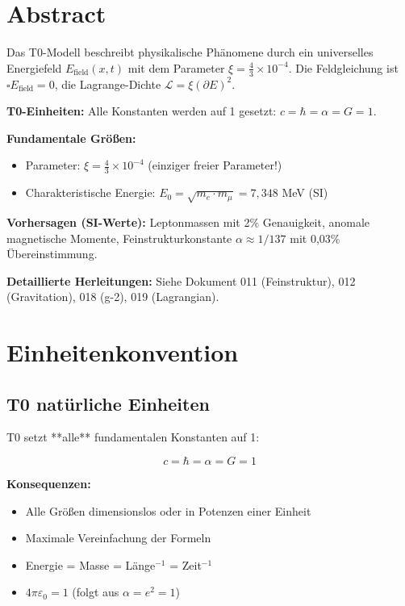 \section*{Abstract}
		Das T0-Modell beschreibt physikalische Phänomene durch ein universelles Energiefeld $E_{\text{field}}(x,t)$ mit dem Parameter $\xi = \frac{4}{3} \times 10^{-4}$. Die Feldgleichung ist $\square E_{\text{field}} = 0$, die Lagrange-Dichte $\mathcal{L} = \xi (\partial E)^2$. 
		
		\textbf{T0-Einheiten:} Alle Konstanten werden auf 1 gesetzt: $c = \hbar = \alpha = G = 1$.
		
		\textbf{Fundamentale Größen:}
		\begin{itemize}
			\item Parameter: $\xi = \frac{4}{3} \times 10^{-4}$ (einziger freier Parameter!)
			\item Charakteristische Energie: $E_0 = \sqrt{m_e \cdot m_\mu} = 7{,}348$ MeV (SI)
		\end{itemize}
		
		\textbf{Vorhersagen (SI-Werte):} Leptonmassen mit 2\% Genauigkeit, anomale magnetische Momente, Feinstrukturkonstante $\alpha \approx 1/137$ mit 0,03\% Übereinstimmung.
		
		\textbf{Detaillierte Herleitungen:} Siehe Dokument 011 (Feinstruktur), 012 (Gravitation), 018 (g-2), 019 (Lagrangian).

	
	
	
	\section{Einheitenkonvention}
	\label{sec:units}
	
	\subsection{T0 natürliche Einheiten}
	
	T0 setzt **alle** fundamentalen Konstanten auf 1:
	
	\begin{equation}
		\boxed{c = \hbar = \alpha = G = 1}
	\end{equation}
	
	\textbf{Konsequenzen:}
	\begin{itemize}
		\item Alle Größen dimensionslos oder in Potenzen einer Einheit
		\item Maximale Vereinfachung der Formeln
		\item Energie = Masse = Länge$^{-1}$ = Zeit$^{-1}$
		\item $4\pi\varepsilon_0 = 1$ (folgt aus $\alpha = e^2 = 1$)
	\end{itemize}
	
